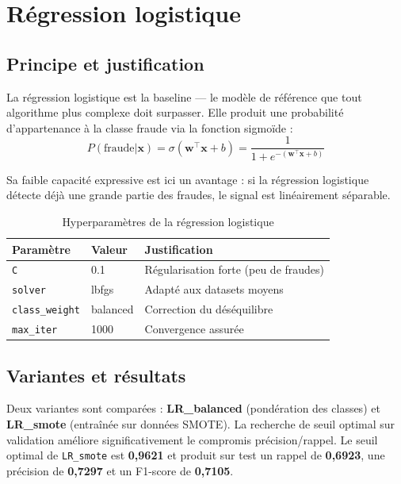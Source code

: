 \documentclass[12pt,a4paper,twoside]{report}
\begin{document}
\section{Régression logistique}

\subsection{Principe et justification}

La régression logistique est la baseline --- le modèle de référence que tout algorithme plus complexe doit surpasser. Elle produit une probabilité d'appartenance à la classe fraude via la fonction sigmoïde :
\[
P(\text{fraude} | \mathbf{x}) = \sigma(\mathbf{w}^\top \mathbf{x} + b) = \frac{1}{1 + e^{-(\mathbf{w}^\top \mathbf{x} + b)}}
\]

Sa faible capacité expressive est ici un avantage : si la régression logistique détecte déjà une grande partie des fraudes, le signal est linéairement séparable.

\begin{table}[H]
\centering
\caption{Hyperparamètres de la régression logistique}
\label{tab:lr_params}
\begin{tabular}{lll}
\toprule
\textbf{Paramètre}    & \textbf{Valeur}    & \textbf{Justification} \\
\midrule
\texttt{C}            & 0.1                & Régularisation forte (peu de fraudes) \\
\texttt{solver}       & lbfgs              & Adapté aux datasets moyens \\
\texttt{class\_weight}& balanced           & Correction du déséquilibre \\
\texttt{max\_iter}    & 1000               & Convergence assurée \\
\bottomrule
\end{tabular}
\end{table}

\subsection{Variantes et résultats}

Deux variantes sont comparées : \textbf{LR\_balanced} (pondération des classes) et \textbf{LR\_smote} (entraînée sur données SMOTE). La recherche de seuil optimal sur validation améliore significativement le compromis précision/rappel. Le seuil optimal de \texttt{LR\_smote} est \textbf{0,9621} et produit sur test un rappel de \textbf{0,6923}, une précision de \textbf{0,7297} et un F1-score de \textbf{0,7105}.
\end{document}
